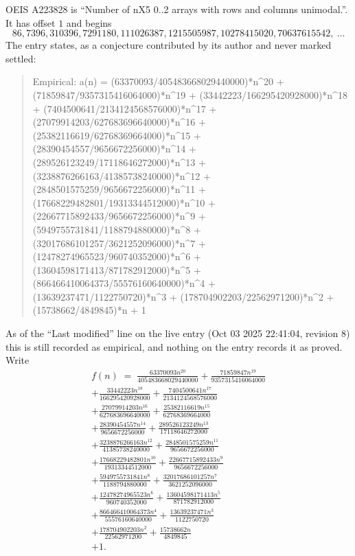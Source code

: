 \documentclass[11pt,a4paper]{article}
\theoremstyle{plain}
\theoremstyle{definition}
\begin{document}
OEIS A223828 is ``Number of nX5 0..2 arrays with rows and columns unimodal.''. It has offset $1$ and begins
\[
86, 7396, 310396, 7291180, 111026387, 1215505987, 10278415020, 70637615542,\ \dots
\]
The entry states, as a conjecture contributed by its author and never marked settled:
\begin{quote}\raggedright\small
Empirical: a(n) = (63370093/405483668029440000)*n\^{}20 + (71859847/9357315416064000)*n\^{}19 + (33442223/166295420928000)*n\^{}18 + (7404500641/2134124568576000)*n\^{}17 + (27079914203/627683696640000)*n\^{}16 + (25382116619/62768369664000)*n\^{}15 + (28390454557/9656672256000)*n\^{}14 + (289526123249/17118646272000)*n\^{}13 + (3238876266163/41385738240000)*n\^{}12 + (2848501575259/9656672256000)*n\^{}11 + (17668229482801/19313344512000)*n\^{}10 + (22667715892433/9656672256000)*n\^{}9 + (5949755731841/1188794880000)*n\^{}8 + (32017686101257/3621252096000)*n\^{}7 + (12478274965523/960740352000)*n\^{}6 + (13604598171413/871782912000)*n\^{}5 + (866466410064373/55576160640000)*n\^{}4 + (13639237471/1122750720)*n\^{}3 + (178704902203/22562971200)*n\^{}2 + (15738662/4849845)*n + 1
\end{quote}
As of the ``Last modified'' line on the live entry (Oct 03 2025 22:41:04, revision 8) this is still
recorded as empirical, and nothing on the entry records it as proved. Write
\begin{multline*}
f(n)\;=\;\frac{63370093 n^{20}}{405483668029440000} + \frac{71859847 n^{19}}{9357315416064000} \\
+ \frac{33442223 n^{18}}{166295420928000} + \frac{7404500641 n^{17}}{2134124568576000} \\
+ \frac{27079914203 n^{16}}{627683696640000} + \frac{25382116619 n^{15}}{62768369664000} \\
+ \frac{28390454557 n^{14}}{9656672256000} + \frac{289526123249 n^{13}}{17118646272000} \\
+ \frac{3238876266163 n^{12}}{41385738240000} + \frac{2848501575259 n^{11}}{9656672256000} \\
+ \frac{17668229482801 n^{10}}{19313344512000} + \frac{22667715892433 n^{9}}{9656672256000} \\
+ \frac{5949755731841 n^{8}}{1188794880000} + \frac{32017686101257 n^{7}}{3621252096000} \\
+ \frac{12478274965523 n^{6}}{960740352000} + \frac{13604598171413 n^{5}}{871782912000} \\
+ \frac{866466410064373 n^{4}}{55576160640000} + \frac{13639237471 n^{3}}{1122750720} \\
+ \frac{178704902203 n^{2}}{22562971200} + \frac{15738662 n}{4849845} \\
+ 1.
\end{multline*}
\end{document}
